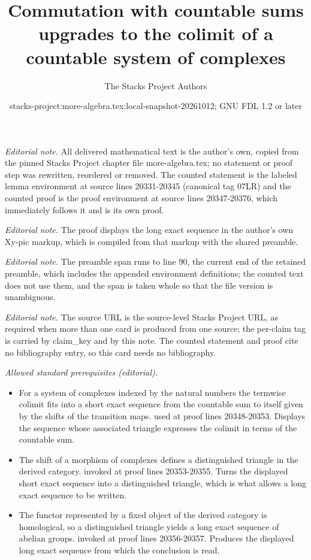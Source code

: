 \documentclass[10pt,a4paper]{amsart}
\title{Commutation with countable sums upgrades to the colimit of a countable system of complexes}
\author{The Stacks Project Authors}
\date{stacks-project:more-algebra.tex:local-snapshot-20261012; GNU FDL 1.2 or later}
\theoremstyle{plain}
\theoremstyle{definition}
\theoremstyle{remark}
\numberwithin{equation}{subsection}
\begin{document}
\maketitle
\setcounter{subsection}{1}
\noindent\textit{Editorial note.} All delivered mathematical text is the author's own, copied from the pinned Stacks Project chapter file more-algebra.tex; no statement or proof step was rewritten, reordered or removed. The counted statement is the labeled lemma environment at source lines 20331-20345 (canonical tag 07LR) and the counted proof is the proof environment at source lines 20347-20376, which immediately follows it and is its own proof.\par\medskip
\noindent\textit{Editorial note.} The proof displays the long exact sequence in the author's own Xy-pic markup, which is compiled from that markup with the shared preamble.\par\medskip
\noindent\textit{Editorial note.} The preamble span runs to line 90, the current end of the retained preamble, which includes the appended environment definitions; the counted text does not use them, and the span is taken whole so that the file version is unambiguous.\par\medskip
\noindent\textit{Editorial note.} The source URL is the source-level Stacks Project URL, as required when more than one card is produced from one source; the per-claim tag is carried by claim\_key and by this note. The counted statement and proof cite no bibliography entry, so this card needs no bibliography.\par\medskip
\noindent\textit{Allowed standard prerequisites (editorial).}\begin{itemize}
\item For a system of complexes indexed by the natural numbers the termwise colimit fits into a short exact sequence from the countable sum to itself given by the shifts of the transition maps. used at proof lines 20348-20353. Displays the sequence whose associated triangle expresses the colimit in terms of the countable sum.
\item The shift of a morphism of complexes defines a distinguished triangle in the derived category. invoked at proof lines 20353-20355. Turns the displayed short exact sequence into a distinguished triangle, which is what allows a long exact sequence to be written.
\item The functor represented by a fixed object of the derived category is homological, so a distinguished triangle yields a long exact sequence of abelian groups. invoked at proof lines 20356-20357. Produces the displayed long exact sequence from which the conclusion is read.
\end{itemize}\medskip
\end{document}
